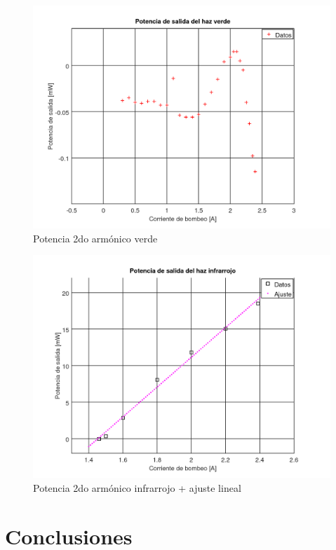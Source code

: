 \documentclass[10pt, a4paper]{article}%
\begin{document}
\begin{multicols}{2}
\begin{figure}[H]
    \centering
    \includegraphics[scale=0.4]{Graficos/pot_verde.png}
    \caption{Potencia 2do armónico verde}
    \label{laservsdist}
\end{figure}

\begin{figure}[H]
    \centering
    \includegraphics[scale=0.4]{Graficos/pot_infrarrojo.png}
    \caption{Potencia 2do armónico infrarrojo + ajuste lineal}
    \label{laservsdist}
\end{figure}



\section{Conclusiones}


\end{multicols}
\end{document}
